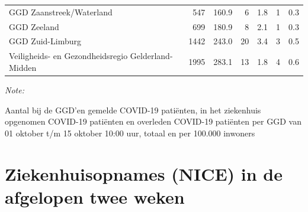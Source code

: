 \documentclass[
  english,
  man,floatsintext]{apa6}
\begin{document}
\begin{table}
\begin{threeparttable}
\begin{tabular}{lrrrrrr}
GGD Zaanstreek/Waterland & 547 & 160.9 & 6 & 1.8 & 1 & 0.3\\
GGD Zeeland & 699 & 180.9 & 8 & 2.1 & 1 & 0.3\\
GGD Zuid-Limburg & 1442 & 243.0 & 20 & 3.4 & 3 & 0.5\\
Veiligheids- en Gezondheidsregio Gelderland-Midden & 1995 & 283.1 & 13 & 1.8 & 4 & 0.6\\
\bottomrule
\end{tabular}
\begin{tablenotes}
\item \textit{Note: } 
\item Aantal bij de GGD’en gemelde COVID-19 patiënten, in het ziekenhuis opgenomen COVID-19 patiënten en overleden COVID-19 patiënten per GGD van 01 oktober t/m 15 oktober 10:00 uur, totaal en per 100.000 inwoners
\end{tablenotes}
\end{threeparttable}
\endgroup{}
\end{table}

\newpage

\hypertarget{ziekenhuisopnames-nice-in-de-afgelopen-twee-weken}{%
\section{Ziekenhuisopnames (NICE) in de afgelopen twee weken}\label{ziekenhuisopnames-nice-in-de-afgelopen-twee-weken}}
\end{document}
